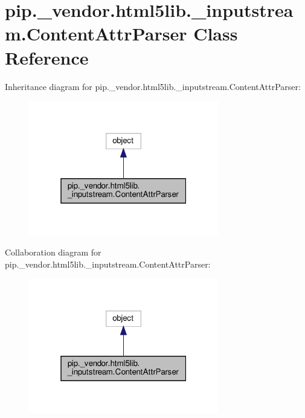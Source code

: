 \hypertarget{classpip_1_1__vendor_1_1html5lib_1_1__inputstream_1_1ContentAttrParser}{}\section{pip.\+\_\+vendor.\+html5lib.\+\_\+inputstream.\+Content\+Attr\+Parser Class Reference}
\label{classpip_1_1__vendor_1_1html5lib_1_1__inputstream_1_1ContentAttrParser}


Inheritance diagram for pip.\+\_\+vendor.\+html5lib.\+\_\+inputstream.\+Content\+Attr\+Parser\+:
\nopagebreak
\begin{figure}[H]
\begin{center}
\leavevmode
\includegraphics[width=235pt]{classpip_1_1__vendor_1_1html5lib_1_1__inputstream_1_1ContentAttrParser__inherit__graph}
\end{center}
\end{figure}


Collaboration diagram for pip.\+\_\+vendor.\+html5lib.\+\_\+inputstream.\+Content\+Attr\+Parser\+:
\nopagebreak
\begin{figure}[H]
\begin{center}
\leavevmode
\includegraphics[width=235pt]{classpip_1_1__vendor_1_1html5lib_1_1__inputstream_1_1ContentAttrParser__coll__graph}
\end{center}
\end{figure}
